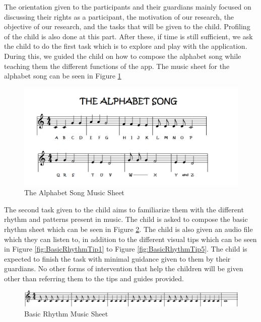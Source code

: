 The orientation given to the participants and their guardians mainly focused on discussing their rights as a participant, the motivation of our research, the objective of our research, and the tasks that will be given to the child. Profiling of the child is also done at this part. After these, if time is still sufficient, we ask the child to do the first task which is to explore and play with the application. During this, we guided the child on how to compose the alphabet song while teaching them the different functions of the app. The music sheet for the alphabet song can be seen in Figure \ref{fig:AlphabetMusicSheet}
\begin{figure}[H]
    \centering
    \includegraphics[width=12cm]{figures/NewFigures/alphabetsongmusicsheet.png}
    \caption{The Alphabet Song Music Sheet}
    \label{fig:AlphabetMusicSheet}
\end{figure}
The second task given to the child aims to familiarize them with the different rhythm and patterns present in music. The child is asked to compose the basic rhythm sheet which can be seen in Figure \ref{fig:BasicRhythmMusicSheet}. The child is also given an audio file which they can listen to, in addition to the different visual tips which can be seen in Figure \ref{fig:BasicRhythmTip1} to Figure \ref{fig:BasicRhythmTip5}. The child is expected to finish the task with minimal guidance given to them by their guardians. No other forms of intervention that help the children will be given other than referring them to the tips and guides provided. 

\begin{figure}[H]
    \centering
    \includegraphics[width=16cm]{figures/NewFigures/BasicRhythmMusicSheet.png}
    \caption{Basic Rhythm Music Sheet}
    \label{fig:BasicRhythmMusicSheet}
\end{figure}

